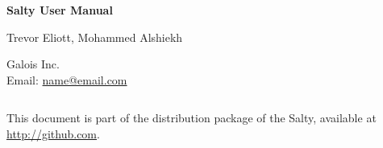 \begin{titlepage}
\begin{center}
  \begin{Huge}
  \textbf{Salty User Manual}\\
  \end{Huge}
  \vspace{0.5cm}
  \vspace{4.0cm}

  \begin{Large}
    \begin{bf}
      Trevor Eliott, Mohammed Alshiekh 
    \end{bf}
  \end{Large}

  \vspace{1cm}
  {Galois Inc.}\\

  \vspace{1cm}
  Email: \url{name@email.com}\\
  \vspace{4.0cm}
\end{center}
\vspace{1in}
\end{titlepage}



\newpage
\thispagestyle{empty}
$~~~~~~~~~~~~~~~~~~~~~~~~~~~~~~~~~~$\\
\vspace{15cm}

\noindent This document is part of the distribution package of the
Salty, available at \url{http://github.com}. \\


\noindent

